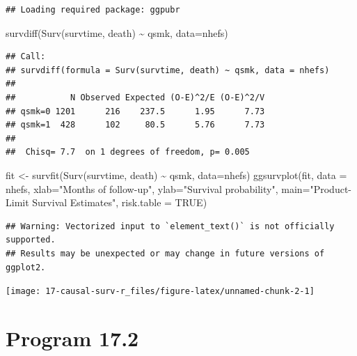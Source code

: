 \documentclass[
  10pt,
]{book}
\newenvironment{Shaded}{\begin{snugshade}}{\end{snugshade}}
\newcommand{\AttributeTok}[1]{\textcolor[rgb]{0.77,0.63,0.00}{#1}}
\newcommand{\ConstantTok}[1]{\textcolor[rgb]{0.00,0.00,0.00}{#1}}
\newcommand{\FunctionTok}[1]{\textcolor[rgb]{0.00,0.00,0.00}{#1}}
\newcommand{\NormalTok}[1]{#1}
\newcommand{\OtherTok}[1]{\textcolor[rgb]{0.56,0.35,0.01}{#1}}
\newcommand{\SpecialCharTok}[1]{\textcolor[rgb]{0.00,0.00,0.00}{#1}}
\newcommand{\StringTok}[1]{\textcolor[rgb]{0.31,0.60,0.02}{#1}}
\begin{document}
\begin{verbatim}
## Loading required package: ggpubr
\end{verbatim}

\begin{Shaded}
\begin{Highlighting}[]
\FunctionTok{survdiff}\NormalTok{(}\FunctionTok{Surv}\NormalTok{(survtime, death) }\SpecialCharTok{\textasciitilde{}}\NormalTok{ qsmk, }\AttributeTok{data=}\NormalTok{nhefs)}
\end{Highlighting}
\end{Shaded}

\begin{verbatim}
## Call:
## survdiff(formula = Surv(survtime, death) ~ qsmk, data = nhefs)
## 
##           N Observed Expected (O-E)^2/E (O-E)^2/V
## qsmk=0 1201      216    237.5      1.95      7.73
## qsmk=1  428      102     80.5      5.76      7.73
## 
##  Chisq= 7.7  on 1 degrees of freedom, p= 0.005
\end{verbatim}

\begin{Shaded}
\begin{Highlighting}[]
\NormalTok{fit }\OtherTok{\textless{}{-}} \FunctionTok{survfit}\NormalTok{(}\FunctionTok{Surv}\NormalTok{(survtime, death) }\SpecialCharTok{\textasciitilde{}}\NormalTok{ qsmk, }\AttributeTok{data=}\NormalTok{nhefs)}
\FunctionTok{ggsurvplot}\NormalTok{(fit, }\AttributeTok{data =}\NormalTok{ nhefs, }\AttributeTok{xlab=}\StringTok{"Months of follow{-}up"}\NormalTok{,}
           \AttributeTok{ylab=}\StringTok{"Survival probability"}\NormalTok{,}
           \AttributeTok{main=}\StringTok{"Product{-}Limit Survival Estimates"}\NormalTok{, }\AttributeTok{risk.table =} \ConstantTok{TRUE}\NormalTok{)}
\end{Highlighting}
\end{Shaded}

\begin{verbatim}
## Warning: Vectorized input to `element_text()` is not officially supported.
## Results may be unexpected or may change in future versions of ggplot2.
\end{verbatim}

\begin{center}\texttt{[image: 17-causal-surv-r\_files/figure-latex/unnamed-chunk-2-1]} \end{center}

\hypertarget{program-17.2}{%
\section{Program 17.2}\label{program-17.2}}
\end{document}
